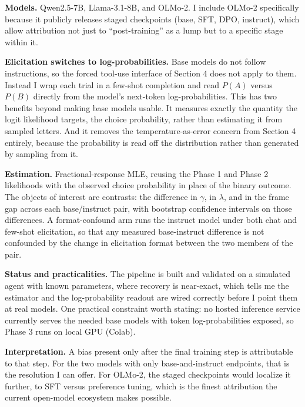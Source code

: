 \documentclass[11pt]{article}
\begin{document}
\textbf{Models.} Qwen2.5-7B, Llama-3.1-8B, and OLMo-2. I include OLMo-2 specifically because it
publicly releases staged checkpoints (base, SFT, DPO, instruct), which allow attribution not just
to ``post-training'' as a lump but to a specific stage within it.

\textbf{Elicitation switches to log-probabilities.} Base models do not follow instructions, so the
forced tool-use interface of Section 4 does not apply to them. Instead I wrap each trial in a
few-shot completion and read $P(A)$ versus $P(B)$ directly from the model's next-token
log-probabilities. This has two benefits beyond making base models usable. It measures exactly the
quantity the logit likelihood targets, the choice probability, rather than estimating it from
sampled letters. And it removes the temperature-as-error concern from Section 4 entirely, because
the probability is read off the distribution rather than generated by sampling from it.

\textbf{Estimation.} Fractional-response MLE, reusing the Phase 1 and Phase 2 likelihoods with the
observed choice probability in place of the binary outcome. The objects of interest are contrasts:
the difference in $\gamma$, in $\lambda$, and in the frame gap across each base/instruct pair, with
bootstrap confidence intervals on those differences. A format-confound arm runs the instruct model
under both chat and few-shot elicitation, so that any measured base-instruct difference is not
confounded by the change in elicitation format between the two members of the pair.

\textbf{Status and practicalities.} The pipeline is built and validated on a simulated agent with
known parameters, where recovery is near-exact, which tells me the estimator and the
log-probability readout are wired correctly before I point them at real models. One practical
constraint worth stating: no hosted inference service currently serves the needed base models with
token log-probabilities exposed, so Phase 3 runs on local GPU (Colab).

\textbf{Interpretation.} A bias present only after the final training step is attributable to that
step. For the two models with only base-and-instruct endpoints, that is the resolution I can offer.
For OLMo-2, the staged checkpoints would localize it further, to SFT versus preference tuning, which
is the finest attribution the current open-model ecosystem makes possible.

\end{document}
